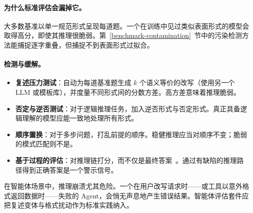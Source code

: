\paragraph{为什么标准评估会漏掉它。}
大多数基准以单一规范形式呈现每道题。一个在训练中见过类似表面形式的模型会取得高分，即使其推理很脆弱。第~\ref{benchmark-contamination}~节中的污染检测方法能捕捉逐字重叠，但捕捉不到表面形式过拟合。

\paragraph{检测与缓解。}
\begin{itemize}
  \item \textbf{复述压力测试}：自动为每道基准题生成 $k$ 个语义等价的改写（使用另一个 LLM 或模板库），并度量不同形式间的分数方差。高方差意味着推理脆弱。
  \item \textbf{否定与逆否测试}：对于逻辑推理任务，加入逆否形式与否定形式。真正具备逻辑理解的模型应能一致地处理所有形式。
  \item \textbf{顺序置换}：对于多步问题，打乱前提的顺序。稳健推理应当对顺序不变；脆弱的模式匹配则不是。
  \item \textbf{基于过程的评估}：对推理链打分，而不仅是最终答案~\cite{lightman2023lets}。通过有缺陷的推理路径得到正确答案是一个警示信号。
\end{itemize}

\begin{warningbox}[推理崩溃与智能体系统]
在智能体场景中，推理崩溃尤其危险。一个在用户改写请求时——或工具以意外格式返回数据时——失败的 Agent，会悄无声息地产生错误结果。智能体评估套件应把复述变体与格式扰动作为标准实践纳入。
\end{warningbox}
